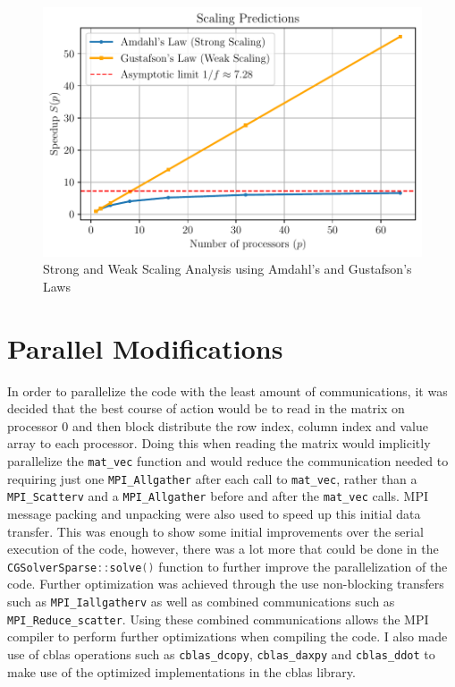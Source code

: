 \begin{figure}[h!]
    \centering
    \includegraphics[width=\textwidth]{plots/scaling_laws.pdf}
    \caption{Strong and Weak Scaling Analysis using Amdahl's and Gustafson's Laws}
    \label{fig:AmdahlPlot}
\end{figure}
\FloatBarrier

\section{Parallel Modifications}
In order to parallelize the code with the least amount of communications, it was decided that the best course of action
would be to read in the matrix on processor 0 and then block distribute the row index, column index and value array to
each processor. Doing this when reading the matrix would implicitly parallelize the \lstinline[language=C]|mat_vec|
function and would reduce the communication needed to requiring just one \lstinline[language=C]|MPI_Allgather| after
each call to \lstinline[language=C]|mat_vec|, rather than a \lstinline[language=C]|MPI_Scatterv| and a
\lstinline[language=C]|MPI_Allgather| before and after the \lstinline[language=C]|mat_vec| calls. MPI message
packing and unpacking were also used to speed up this initial data transfer. This was enough to show some initial
improvements over the serial execution of the code, however, there was a lot more that could be done in the
\lstinline[language=C]|CGSolverSparse::solve()| function to further improve the parallelization of the code. Further
optimization was achieved through the use non-blocking transfers such as \lstinline[language=C]|MPI_Iallgatherv| as
well as combined communications such as \lstinline[language=C]|MPI_Reduce_scatter|. Using these combined
communications allows the MPI compiler to perform further optimizations when compiling the code. I also made use of
cblas operations such as \lstinline[language=C]|cblas_dcopy|, \lstinline[language=C]|cblas_daxpy| and
\lstinline[language=C]|cblas_ddot| to make use of the optimized implementations in the cblas library.

